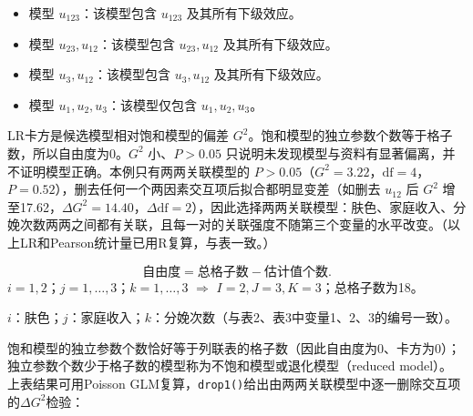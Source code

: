 \begin{itemize}
\item 模型 $u_{123}$：该模型包含 $u_{123}$ 及其所有下级效应。
\item 模型 $u_{23},u_{12}$：该模型包含 $u_{23},u_{12}$ 及其所有下级效应。
\item 模型 $u_3,u_{12}$：该模型包含 $u_3,u_{12}$ 及其所有下级效应。
\item 模型 $u_1,u_2,u_3$：该模型仅包含 $u_1,u_2,u_3$。
\end{itemize}
\begin{annotation}
LR卡方是候选模型相对饱和模型的偏差 $G^2$。饱和模型的独立参数个数等于格子数，所以自由度为0。$G^2$ 小、$P>0.05$ 只说明未发现模型与资料有显著偏离，并不证明模型正确。本例只有两两关联模型的 $P>0.05$（$G^2=3.22$，$\mathrm{df}=4$，$P=0.52$），删去任何一个两因素交互项后拟合都明显变差（如删去 $u_{12}$ 后 $G^2$ 增至17.62，$\Delta G^2=14.40$，$\Delta\mathrm{df}=2$），因此选择两两关联模型：肤色、家庭收入、分娩次数两两之间都有关联，且每一对的关联强度不随第三个变量的水平改变。（以上LR和Pearson统计量已用R复算，与表一致。）
\end{annotation}
\[
\text{自由度}=\text{总格子数}-\text{估计值个数}.
\]
$i=1,2$；$j=1,\ldots,3$；$k=1,\ldots,3$ $\Rightarrow$ $I=2,J=3,K=3$；总格子数为18。
\begin{annotation}$i$：肤色；$j$：家庭收入；$k$：分娩次数（与表2、表3中变量1、2、3的编号一致）。\end{annotation}
饱和模型的独立参数个数恰好等于列联表的格子数（因此自由度为0、卡方为0）；独立参数个数少于格子数的模型称为不饱和模型或退化模型（reduced model）。
上表结果可用Poisson GLM复算，\texttt{drop1()}给出由两两关联模型中逐一删除交互项的$\Delta G^2$检验：
